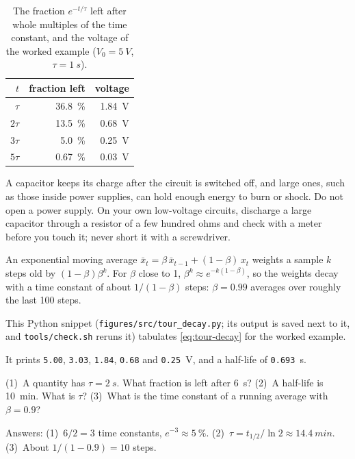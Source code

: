 \begin{table}[tbp]
\centering
\small
\caption{The fraction $e^{-t/\tau}$ left after whole multiples of the time constant, and the voltage of the
worked example ($V_0=\qty{5}{V}$, $\tau=\qty{1}{s}$).}
\label{tab:tour-fractions}
\begin{tabular}{@{}rrr@{}}
\toprule
$t$ & fraction left & voltage \\
\midrule
$\tau$  & \qty{36.8}{\percent} & \qty{1.84}{V} \\
$2\tau$ & \qty{13.5}{\percent} & \qty{0.68}{V} \\
$3\tau$ & \qty{5.0}{\percent}  & \qty{0.25}{V} \\
$5\tau$ & \qty{0.67}{\percent} & \qty{0.03}{V} \\
\bottomrule
\end{tabular}
\end{table}

\begin{cautionbox}
A capacitor keeps its charge after the circuit is switched off, and large ones, such as those inside power supplies,
can hold enough energy to burn or shock. Do not open a power supply. On your own low-voltage circuits, discharge a
large capacitor through a resistor of a few hundred ohms and check with a meter before you touch it; never short it
with a screwdriver.
\end{cautionbox}

\begin{connectionbox}
An exponential moving average $\bar x_t=\beta\,\bar x_{t-1}+(1-\beta)\,x_t$ weights a sample $k$ steps old by
$(1-\beta)\beta^k$. For $\beta$ close to 1, $\beta^k\approx e^{-k(1-\beta)}$, so the weights decay with a time
constant of about $1/(1-\beta)$ steps: $\beta=0.99$ averages over roughly the last 100 steps.
\end{connectionbox}

\begin{buildbox}
This Python snippet (\texttt{figures/src/tour\_decay.py}; its output is saved next to it, and
\texttt{tools/check.sh} reruns it) tabulates \cref{eq:tour-decay} for the worked example.

It prints \texttt{5.00}, \texttt{3.03}, \texttt{1.84}, \texttt{0.68} and \texttt{0.25}~V, and a half-life of
\texttt{0.693}~s.
\end{buildbox}

\begin{checkbox}
(1)~A quantity has $\tau=\qty{2}{s}$. What fraction is left after \qty{6}{s}? (2)~A half-life is \qty{10}{min}.
What is $\tau$? (3)~What is the time constant of a running average with $\beta=0.9$?

{\footnotesize Answers: (1)~$6/2=3$ time constants, $e^{-3}\approx\qty{5}{\percent}$. (2)~$\tau=t_{1/2}/\ln2
\approx\qty{14.4}{min}$. (3)~About $1/(1-0.9)=10$ steps.\par}
\end{checkbox}

